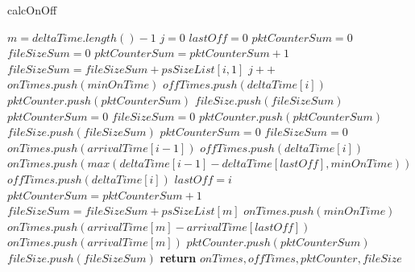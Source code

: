 	
\begin{algorithm}[ht!]
	\caption{calcOnOff}
	\label{alg:calcOnOff}
	\begin{algorithmic}[1]
		\small
		\State $m = deltaTime.length() - 1$
		\State $j = 0$
		\State $lastOff = 0$
		\State $pktCounterSum = 0$
		\State $fileSizeSum = 0$
		\State $pktCounterSum = pktCounterSum + 1$
		\State $fileSizeSum = fileSizeSum + psSizeList[i, 1]$
		 
		\State $j++$
		\State $onTimes.push(minOnTime)$
		\State $offTimes.push(deltaTime[i])$
		\State $pktCounter.push(pktCounterSum)$
		\State $fileSize.push(fileSizeSum)$
		\State $pktCounterSum = 0$
		\State $fileSizeSum = 0$
		\Else {} 
		\State $pktCounter.push(pktCounterSum)$
		\State $fileSize.push(fileSizeSum)$
		\State $pktCounterSum = 0$
		\State $fileSizeSum = 0$
		\State $onTimes.push(arrivalTime[i - 1])$
		\State $offTimes.push(deltaTime[i])$
		\Else {} 
		\State  $onTimes.push(max(deltaTime[i-1] - deltaTime[lastOff], minOnTime))$ 
		\State  $offTimes.push(deltaTime[i])$
		\EndIf
		\State $lastOff = i$
		\EndIf 
		\EndIf       
		\EndFor
		\State $pktCounterSum = pktCounterSum + 1$
		\State $fileSizeSum = fileSizeSum + psSizeList[m]$
		 
		\State $onTimes.push(minOnTime)$ %
		\Else {}
		\State $onTimes.push(arrivalTime[m] - arrivalTime[lastOff])$ 
		\Else 
		\State $onTimes.push(arrivalTime[m])$ 
		\EndIf
		\EndIf
		\State $pktCounter.push(pktCounterSum)$
		\State $fileSize.push(fileSizeSum)$
		\State \textbf{return} $onTimes, offTimes, pktCounter, fileSize$
		\EndFunction
	\end{algorithmic}
\end{algorithm}
	
